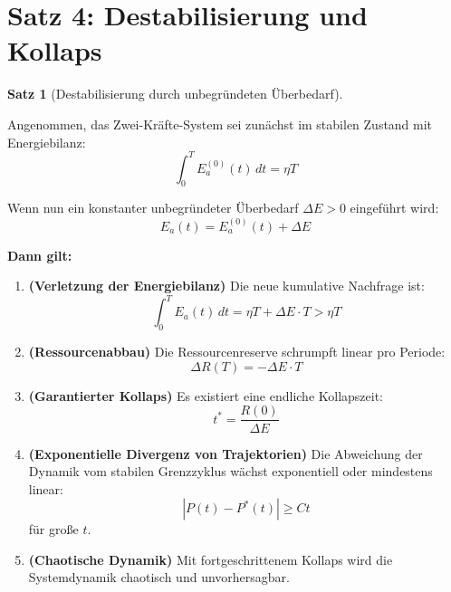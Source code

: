 \documentclass[a4paper,11pt]{report}
\theoremstyle{definition}
\newtheorem{satz}{Satz}[chapter]
\begin{document}
\section{Satz 4: Destabilisierung und Kollaps}

\begin{satz}[Destabilisierung durch unbegründeten Überbedarf]\label{satz:destabilisierung}
    
    Angenommen, das Zwei-Kräfte-System sei zunächst im stabilen Zustand mit Energiebilanz:
    \begin{equation}
        \int_0^T E_a^{(0)}(t) \, dt = \eta T
    \end{equation}
    
    Wenn nun ein konstanter unbegründeter Überbedarf $\Delta E > 0$ eingeführt wird:
    \begin{equation}
        E_a(t) = E_a^{(0)}(t) + \Delta E
    \end{equation}
    
    \textbf{Dann gilt:}
    
    \begin{enumerate}
        \item \textbf{(Verletzung der Energiebilanz)} Die neue kumulative Nachfrage ist:
        \begin{equation}
            \int_0^T E_a(t) \, dt = \eta T + \Delta E \cdot T > \eta T
        \end{equation}
        
        \item \textbf{(Ressourcenabbau)} Die Ressourcenreserve schrumpft linear pro Periode:
        \begin{equation}
            \Delta R(T) = -\Delta E \cdot T
        \end{equation}
        
        \item \textbf{(Garantierter Kollaps)} Es existiert eine endliche Kollapszeit:
        \begin{equation}
            \boxed{t^* = \frac{R(0)}{\Delta E}}
        \end{equation}
        
        \item \textbf{(Exponentielle Divergenz von Trajektorien)} Die Abweichung der Dynamik vom stabilen Grenzzyklus wächst exponentiell oder mindestens linear:
        \begin{equation}
            |P(t) - P^*(t)| \geq Ct
        \end{equation}
        für große $t$.
        
        \item \textbf{(Chaotische Dynamik)} Mit fortgeschrittenem Kollaps wird die Systemdynamik chaotisch und unvorhersagbar.
    \end{enumerate}
\end{satz}
\end{document}
